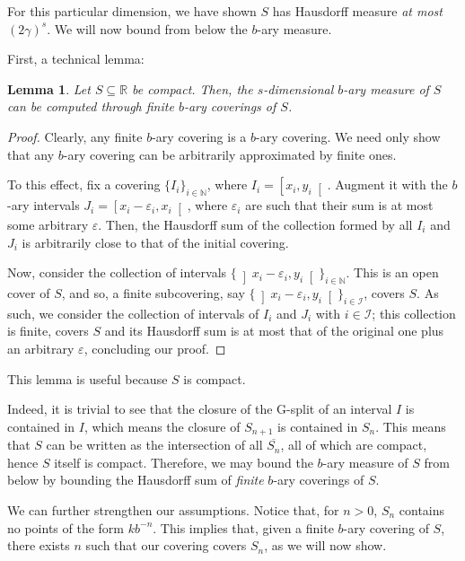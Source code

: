 \documentclass[11pt, reqno]{amsart}
\newcommand{\R}{\mathbb{R}}
\newcommand{\N}{\mathbb{N}}
\newtheorem{lemma}{Lemma}
\begin{document}
For this particular dimension, we have shown $S$ has Hausdorff measure \emph{at most} $(2 \gamma)^s$. We will now bound from below the $b$-ary measure.

First, a technical lemma:

\begin{lemma}
Let $S \subseteq \R$ be compact. Then, the $s$-dimensional $b$-ary measure of $S$ can be computed through finite $b$-ary coverings of $S$.
\end{lemma}

\begin{proof}
Clearly, any finite $b$-ary covering is a $b$-ary covering. We need only show that any $b$-ary covering can be arbitrarily approximated by finite ones.

To this effect, fix a covering $\{ I_i \}_{i \in \N}$, where $I_i = \left[x_i, y_i \right[$. Augment it with the $b$-ary intervals $J_i = \left[x_i - \varepsilon_i, x_i \right[$, where $\varepsilon_i$ are such that their sum is at most some arbitrary $\varepsilon$. Then, the Hausdorff sum of the collection formed by all $I_i$ and $J_i$ is arbitrarily close to that of the initial covering.

Now, consider the collection of intervals $\{ \left]x_i - \varepsilon_i, y_i \right[ \}_{i \in \N}$. This is an open cover of $S$, and so, a finite subcovering, say $\{ \left]x_i - \varepsilon_i, y_i \right[ \}_{i \in \mathcal{I}}$, covers $S$. As such, we consider the collection of intervals of $I_i$ and $J_i$ with $i \in \mathcal{I}$; this collection is finite, covers $S$ and its Hausdorff sum is at most that of the original one plus an arbitrary $\varepsilon$, concluding our proof.
\end{proof}

This lemma is useful because $S$ is compact.

Indeed, it is trivial to see that the closure of the G-split of an interval $I$ is contained in $I$, which means the closure of $S_{n+1}$ is contained in $S_n$. This means that $S$ can be written as the intersection of all $\overline{S_n}$, all of which are compact, hence $S$ itself is compact. Therefore, we may bound the $b$-ary measure of $S$ from below by bounding the Hausdorff sum of \emph{finite} $b$-ary coverings of $S$.

We can further strengthen our assumptions. Notice that, for $n > 0$, $S_n$ contains no points of the form $k b^{-n}$. This implies that, given a finite $b$-ary covering of $S$, there exists $n$ such that our covering covers $S_n$, as we will now show.
\end{document}
